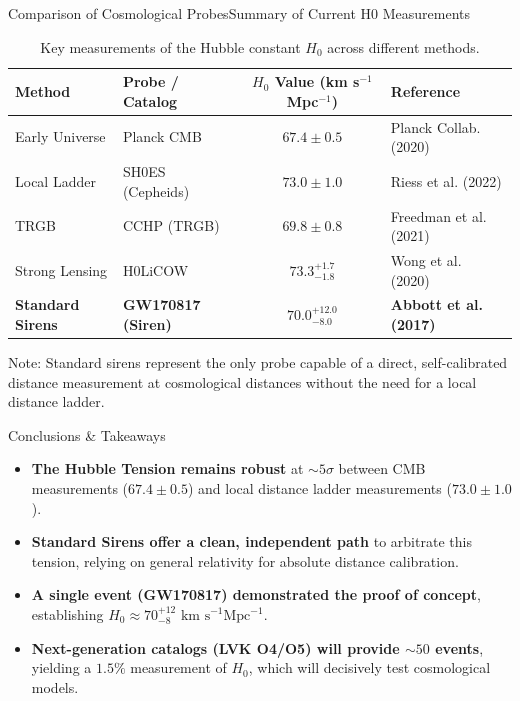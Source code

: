 \begin{frame}{Comparison of Cosmological Probes}{Summary of Current H0 Measurements}
  \centering
  \begin{table}
    \caption{Key measurements of the Hubble constant $H_0$ across different methods.}
    \vspace{0.2em}
    \fontsize{8.5pt}{10.5pt}\selectfont
    \begin{tabular}{llcl}
      \toprule
      \textbf{Method} & \textbf{Probe / Catalog} & \textbf{$H_0$ Value (km s$^{-1}$Mpc$^{-1}$)} & \textbf{Reference} \\
      \midrule
      Early Universe & Planck CMB & $67.4 \pm 0.5$ & Planck Collab. (2020) \\
      Local Ladder & SH0ES (Cepheids) & $73.0 \pm 1.0$ & Riess et al. (2022) \\
      TRGB & CCHP (TRGB) & $69.8 \pm 0.8$ & Freedman et al. (2021) \\
      Strong Lensing & H0LiCOW & $73.3^{+1.7}_{-1.8}$ & Wong et al. (2020) \\
      \midrule
      \textbf{Standard Sirens} & \textbf{GW170817 (Siren)} & \textbf{$70.0^{+12.0}_{-8.0}$} & \textbf{Abbott et al. (2017)} \\
      \bottomrule
    \end{tabular}
  \end{table}
  \begin{minipage}{0.9\textwidth}
    \centering
    \fontsize{8pt}{10pt}\selectfont\color{cosmicslate} Note: Standard sirens represent the only probe capable of a direct, self-calibrated distance measurement at cosmological distances without the need for a local distance ladder.
  \end{minipage}
\end{frame}

\begin{frame}{Conclusions \& Takeaways}
  \begin{itemize}
    \item \textbf{The Hubble Tension remains robust} at $\sim 5\sigma$ between CMB measurements ($67.4 \pm 0.5$) and local distance ladder measurements ($73.0 \pm 1.0$).
    \vspace{0.8em}
    \item \textbf{Standard Sirens offer a clean, independent path} to arbitrate this tension, relying on general relativity for absolute distance calibration.
    \vspace{0.8em}
    \item \textbf{A single event (GW170817) demonstrated the proof of concept}, establishing $H_0 \approx 70^{+12}_{-8} \text{ km s}^{-1}\text{Mpc}^{-1}$.
    \vspace{0.8em}
    \item \textbf{Next-generation catalogs (LVK O4/O5) will provide $\sim 50$ events}, yielding a $1.5\%$ measurement of $H_0$, which will decisively test cosmological models.
  \end{itemize}
\end{frame}

